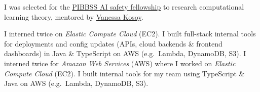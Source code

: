 \ifindustry %
\else %
\fi

\smallskip
I was selected for the \href{https://princint.ai/programs/fellowship/}{PIBBSS AI safety
fellowship} to research computational learning theory, mentored by
\href{https://coral-research.org/our-team/}{Vanessa Kosoy}.

\divider

\smallskip
\ifindustry %
	I interned twice on \textit{Elastic Compute Cloud} (EC2). I built full-stack internal tools
	for deployments and config updates (APIs, cloud backends \& frontend
	dashboards) in Java \& TypeScript on AWS (e.g.\ Lambda, DynamoDB, S3).
\else %
	I interned twice for \textit{Amazon Web Services} (AWS) where I worked on \textit{Elastic Compute
	Cloud} (EC2). I built internal tools for my team using TypeScript \& Java on AWS (e.g.\ Lambda, DynamoDB, S3).
\fi %

